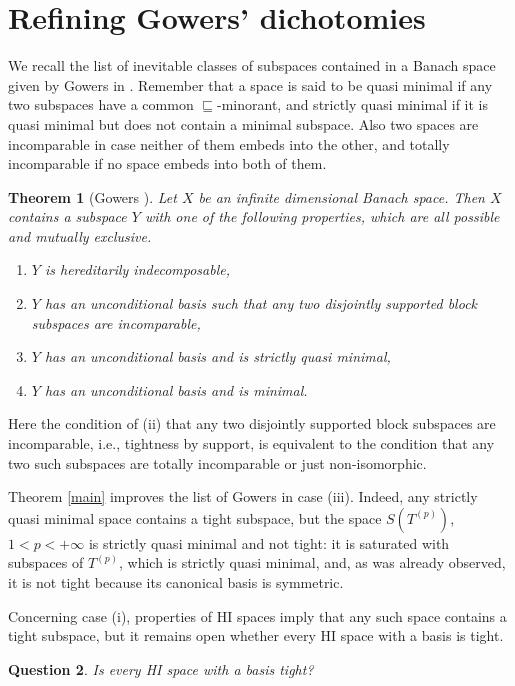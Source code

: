 \documentclass[10pt]{amsart}
\numberwithin{equation}{section}
\newtheorem{thm}{Theorem}[section]
\newtheorem{quest}[thm]{Question}
\begin{document}
\section{Refining Gowers' dichotomies}\label{gowers'dichotomies}

We recall the list of inevitable classes of subspaces contained in a Banach
space given by Gowers in \cite{g:dicho}. Remember that a space is said to be
quasi minimal if any two subspaces have a common $\sqsubseteq$-minorant, and
strictly quasi minimal if it is quasi minimal but does not contain a minimal
subspace.  Also two spaces are incomparable in case neither of them embeds into
the other, and  totally incomparable if no space embeds into both of them.

\begin{thm}[Gowers \cite{g:dicho}] \label{gowers}
 Let $X$ be an infinite dimensional Banach space. Then $X$ contains a subspace $Y$ with one of the following
properties, which are all possible and mutually exclusive.
\begin{enumerate}
\item[(i)]  $Y$ is hereditarily indecomposable,
\item[(ii)] $Y$ has an unconditional basis such that any two disjointly supported block subspaces are incomparable,
\item[(iii)] $Y$ has an unconditional basis and is strictly quasi minimal,
\item[(iv)] $Y$ has an unconditional basis and is minimal.
\end{enumerate}
\end{thm}
Here the condition of (ii) that any two disjointly supported block subspaces
are incomparable, i.e., tightness by support, is equivalent to the condition
that any two such subspaces are totally incomparable or just non-isomorphic.

Theorem \ref{main} improves the list of Gowers in case (iii). Indeed, any
strictly quasi minimal space contains a tight subspace, but the space
$S(T^{(p)})$, $1<p<+\infty$ is strictly quasi minimal and not tight: it is
saturated with subspaces of $T^{(p)}$, which is strictly quasi minimal, and, as
was already observed, it is not tight because its canonical basis is symmetric.

Concerning case (i),  properties of HI spaces imply that any such space
contains a tight subspace, but it remains open whether every HI space with a
basis is tight.

\begin{quest} Is every HI space with a basis tight? \end{quest}
\end{document}
